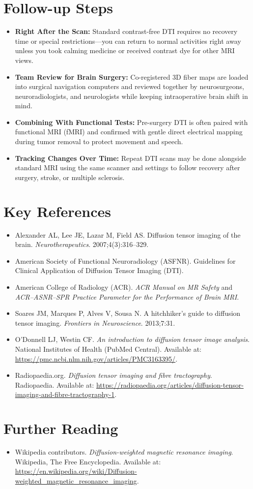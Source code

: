 \section{Follow-up Steps}

\begin{itemize}
    \item \textbf{Right After the Scan:} Standard contrast-free DTI requires no recovery time or special restrictions---you can return to normal activities right away unless you took calming medicine or received contrast dye for other MRI views.
    \item \textbf{Team Review for Brain Surgery:} Co-registered 3D fiber maps are loaded into surgical navigation computers and reviewed together by neurosurgeons, neuroradiologists, and neurologists while keeping intraoperative brain shift in mind.
    \item \textbf{Combining With Functional Tests:} Pre-surgery DTI is often paired with functional MRI (fMRI) and confirmed with gentle direct electrical mapping during tumor removal to protect movement and speech.
    \item \textbf{Tracking Changes Over Time:} Repeat DTI scans may be done alongside standard MRI using the same scanner and settings to follow recovery after surgery, stroke, or multiple sclerosis.
\end{itemize}

\section{Key References}

\begin{itemize}
    \item Alexander AL, Lee JE, Lazar M, Field AS. Diffusion tensor imaging of the brain. \textit{Neurotherapeutics}. 2007;4(3):316--329.
    \item American Society of Functional Neuroradiology (ASFNR). Guidelines for Clinical Application of Diffusion Tensor Imaging (DTI).
    \item American College of Radiology (ACR). \textit{ACR Manual on MR Safety} and \textit{ACR--ASNR--SPR Practice Parameter for the Performance of Brain MRI}.
    \item Soares JM, Marques P, Alves V, Sousa N. A hitchhiker's guide to diffusion tensor imaging. \textit{Frontiers in Neuroscience}. 2013;7:31.
    \item O'Donnell LJ, Westin CF. \textit{An introduction to diffusion tensor image analysis}. National Institutes of Health (PubMed Central). Available at: \url{https://pmc.ncbi.nlm.nih.gov/articles/PMC3163395/}.
    \item Radiopaedia.org. \textit{Diffusion tensor imaging and fibre tractography}. Radiopaedia. Available at: \url{https://radiopaedia.org/articles/diffusion-tensor-imaging-and-fibre-tractography-1}.
\end{itemize}

\section{Further Reading}
\begin{itemize}
  \item Wikipedia contributors. \textit{Diffusion-weighted magnetic resonance imaging}. Wikipedia, The Free Encyclopedia. Available at: \url{https://en.wikipedia.org/wiki/Diffusion-weighted_magnetic_resonance_imaging}.
\end{itemize}
